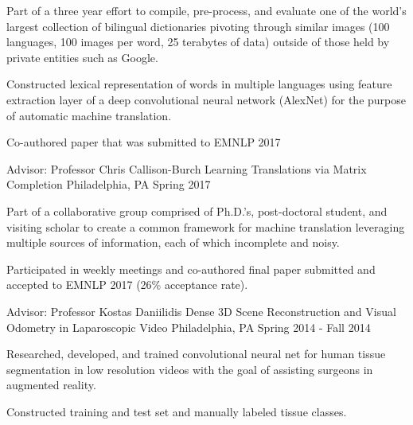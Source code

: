 \begin{cventries}
{\begin{cvitems}
        \item {Part of a three year effort to compile, pre-process, and evaluate one of the world’s largest collection of bilingual dictionaries pivoting through similar images (100 languages, 100 images per word, 25 terabytes of data) outside of those held by private entities such as Google.}
        \item {Constructed lexical representation of words in multiple languages using feature extraction layer of a deep convolutional neural network (AlexNet) for the purpose of automatic machine translation.}
        \item {Co-authored paper that was submitted to EMNLP 2017}
      \end{cvitems} 
    }
  \cventry
    {Advisor: Professor Chris Callison-Burch}
    {Learning Translations via Matrix Completion}
    {Philadelphia, PA}
    {Spring 2017}
    {
      \begin{cvitems}
         \item {Part of a collaborative group comprised of Ph.D.’s, post-doctoral student, and visiting scholar to create a common framework for machine translation leveraging multiple sources of information, each of which incomplete and noisy.}
        \item {Participated in weekly meetings and co-authored final paper submitted and accepted to EMNLP 2017 (26\% acceptance rate).}
      \end{cvitems}
    }
  \cventry
    {Advisor: Professor Kostas Daniilidis}
    {Dense 3D Scene Reconstruction and Visual Odometry in Laparoscopic Video}
    {Philadelphia, PA}
    {Spring 2014 - Fall 2014}
    {
      \begin{cvitems}
        \item {Researched, developed, and trained convolutional neural net for human tissue segmentation in low resolution videos with the goal of assisting surgeons in augmented reality.}
        \item {Constructed training and test set and manually labeled tissue classes.}
      \end{cvitems}
    }
\end{cventries}
